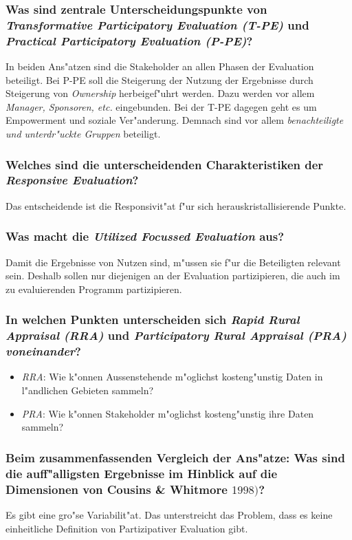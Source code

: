 \subsubsection{Was sind zentrale Unterscheidungspunkte von \emph{Transformative Participatory Evaluation (T-PE)} und \emph{Practical Participatory Evaluation (P-PE)}?}
In beiden Ans"atzen sind die Stakeholder an allen Phasen der Evaluation beteiligt. Bei P-PE soll die Steigerung der Nutzung der Ergebnisse durch Steigerung von \emph{Ownership} herbeigef"uhrt werden. Dazu werden vor allem \emph{Manager, Sponsoren, etc.} eingebunden. Bei der T-PE dagegen geht es um Empowerment und soziale Ver"anderung. Demnach sind vor allem \emph{benachteiligte und unterdr"uckte Gruppen} beteiligt.

\subsubsection{Welches sind die unterscheidenden Charakteristiken der \emph{Responsive Evaluation}?}
Das entscheidende ist die Responsivit"at f"ur sich herauskristallisierende Punkte.

\subsubsection{Was macht die \emph{Utilized Focussed Evaluation} aus?}
Damit die Ergebnisse von Nutzen sind, m"ussen sie f"ur die Beteiligten relevant sein. Deshalb sollen nur diejenigen an der Evaluation partizipieren, die auch im zu evaluierenden Programm partizipieren.

\subsubsection{In welchen Punkten unterscheiden sich \emph{Rapid Rural Appraisal (RRA)} und \emph{Participatory Rural Appraisal (PRA) voneinander}?}
\begin{itemize}
        \item \emph{RRA}: Wie k"onnen Aussenstehende m"oglichst kosteng"unstig Daten in l"andlichen Gebieten sammeln? 
        \item \emph{PRA}: Wie k"onnen Stakeholder m"oglichst kosteng"unstig ihre Daten sammeln? 
\end{itemize}

\subsubsection{Beim zusammenfassenden Vergleich der Ans"atze: Was sind die auff"alligsten Ergebnisse im Hinblick auf die Dimensionen von Cousins \& Whitmore $1998)$?}
Es gibt eine gro"se Variabilit"at. Das unterstreicht das Problem, dass es keine einheitliche Definition von Partizipativer Evaluation gibt.


